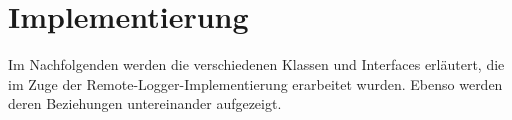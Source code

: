 \section{Implementierung}
Im Nachfolgenden werden die verschiedenen Klassen und Interfaces erläutert, die im Zuge der Remote-Logger-Implementierung erarbeitet wurden. Ebenso werden deren Beziehungen untereinander aufgezeigt.


\newpage


\newpage


\newpage